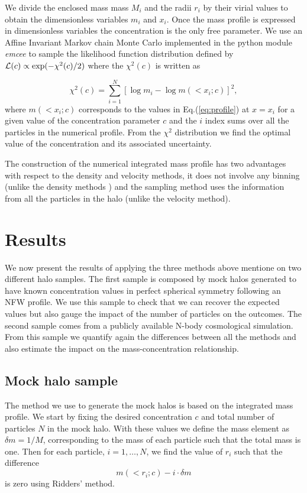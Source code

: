 \documentclass[a4,useAMS,usenatbib,usegraphicx]{mn2e}
\begin{document}
We divide the enclosed mass mass $M_i$ and the radii $r_i$ by their
virial values to obtain the dimensionless variables $m_i$ and $x_i$.
Once the mass profile is expressed in dimensionless variables the
concentration is the only free parameter. We use an Affine Invariant
Markov chain Monte Carlo implemented in the python module {\em emcee}
\citep{emcee} to sample the likelihood function distribution defined
by ${\cal L}(c)\propto \exp(-\chi^2(c)/2)$ where the $\chi^2(c)$ is
written as

\begin{equation}
\chi^2(c)= \sum_{i=1}^{N}[\log m_i - \log m(< x_i;c)]^2,
\end{equation}
%
where $m(<x_i;c)$ corresponds to the values in Eq.(\ref{eq:profile})
at $x=x_i$ for a given value of the concentration parameter $c$ and
the $i$ index sums over all the particles in the numerical profile.
From the $\chi^2$ distribution we find the optimal value of the
concentration and its associated uncertainty.

The construction of the numerical integrated mass profile has two
advantages with respect to the density and velocity methods, it does
not involve any binning (unlike the density methods ) and the sampling
method uses the information from all the particles in the halo (unlike
the velocity method).


\section{Results}
\label{sec:results}

We now present the results of applying the three methods above
mentione on two different halo samples.  The first sample is composed
by mock halos generated to have known concentration values in perfect
spherical symmetry following an NFW profile.  We use this sample to
check that we can recover the expected values but also gauge the
impact of the number of particles on the outcomes.  The second sample
comes from a publicly available N-body cosmological simulation.  From
this sample we quantify again the differences between all the methods
and also estimate the impact on the mass-concentration relationship.


\subsection{Mock halo sample}

The method we use to generate the mock halos is based on the
integrated mass profile.  We start by fixing the desired concentration
$c$ and total number of particles $N$ in the mock halo.  With these
values we define the mass element as $\delta m = 1/M$, corresponding
to the mass of each particle such that the total mass is one.  Then
for each particle, $i=1,\ldots,N$, we find the value of $r_i$ such
that the difference
%
\begin{equation}
m(<r_i;c) - i \cdot \delta m
\end{equation}
%
is zero using Ridders' method.
\end{document}
